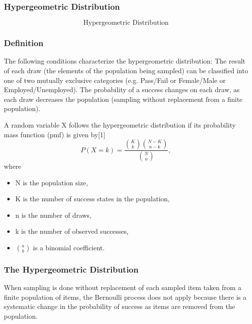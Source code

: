 \documentclass[IntroMain.tex]{subfiles}
\begin{document}
\begin{frame}
	\frametitle{Hypergeometric Distribution}
	\Large
\[	\mbox{Hypergeometric Distribution}\]
\end{frame}






\begin{frame}
\frametitle{Definition}

The following conditions characterize the hypergeometric distribution:
The result of each draw (the elements of the population being sampled) can be classified into one of two mutually exclusive categories (e.g. Pass/Fail or Female/Male or Employed/Unemployed).
The probability of a success changes on each draw, as each draw decreases the population (sampling without replacement from a finite population).
\end{frame}
\begin{frame}
A random variable X follows the hypergeometric distribution if its probability mass function (pmf) is given by[1]
\[ P(X = k) = \frac{\binom{K}{k} \binom{N - K}{n-k}}{\binom{N}{n}},\]
where
\begin{itemize}
\item N is the population size,
\item K is the number of success states in the population,
\item n is the number of draws,
\item k is the number of observed successes,
\item $\textstyle {a \choose b}$ is a binomial coefficient.
\end{itemize}
\end{frame}
\begin{frame}
\frametitle{The Hypergeometric Distribution }
	
	When sampling is done without replacement of each sampled item taken from a finite population of items, the
	Bernoulli process does not apply because there is a systematic change in the probability of success as items are
	removed from the population. 
	
\end{frame}
\end{document}
